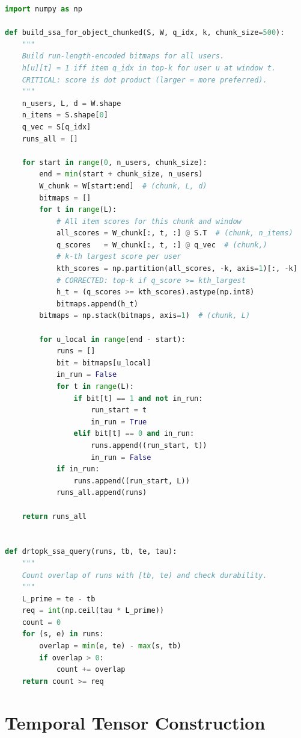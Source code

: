 \begin{lstlisting}[language=Python, caption={Exact bitmap construction and SSA verify (\texttt{baselines/durable/ssa.py})}]
import numpy as np

def build_ssa_for_object_chunked(S, W, q_idx, k, chunk_size=500):
    """
    Build run-length-encoded bitmaps for all users.
    h[u][t] = 1 iff item q_idx in top-k for user u at window t.
    CRITICAL: score is dot product (larger = more preferred).
    """
    n_users, L, d = W.shape
    n_items = S.shape[0]
    q_vec = S[q_idx]
    runs_all = []

    for start in range(0, n_users, chunk_size):
        end = min(start + chunk_size, n_users)
        W_chunk = W[start:end]  # (chunk, L, d)
        bitmaps = []
        for t in range(L):
            # All item scores for this chunk and window
            all_scores = W_chunk[:, t, :] @ S.T  # (chunk, n_items)
            q_scores   = W_chunk[:, t, :] @ q_vec  # (chunk,)
            # k-th largest score per user
            kth_scores = np.partition(all_scores, -k, axis=1)[:, -k]
            # CORRECTED: top-k if q_score >= kth_largest
            h_t = (q_scores >= kth_scores).astype(np.int8)
            bitmaps.append(h_t)
        bitmaps = np.stack(bitmaps, axis=1)  # (chunk, L)

        for u_local in range(end - start):
            runs = []
            bit = bitmaps[u_local]
            in_run = False
            for t in range(L):
                if bit[t] == 1 and not in_run:
                    run_start = t
                    in_run = True
                elif bit[t] == 0 and in_run:
                    runs.append((run_start, t))
                    in_run = False
            if in_run:
                runs.append((run_start, L))
            runs_all.append(runs)

    return runs_all


def drtopk_ssa_query(runs, tb, te, tau):
    """
    Count overlap of runs with [tb, te) and check durability.
    """
    L_prime = te - tb
    req = int(np.ceil(tau * L_prime))
    count = 0
    for (s, e) in runs:
        overlap = min(e, te) - max(s, tb)
        if overlap > 0:
            count += overlap
    return count >= req
\end{lstlisting}

\section{Temporal Tensor Construction}

